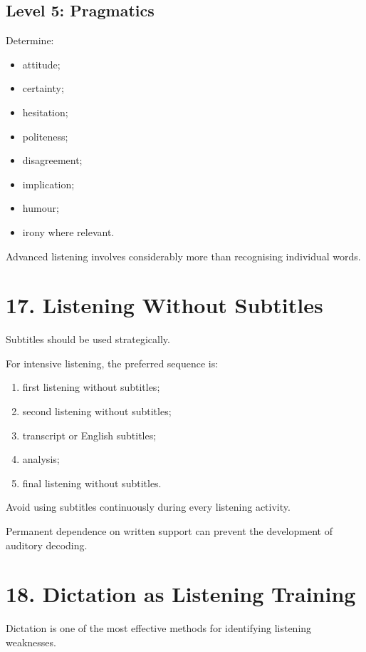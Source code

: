 \subsection*{Level 5: Pragmatics}

Determine:

\begin{itemize}
    \item attitude;
    \item certainty;
    \item hesitation;
    \item politeness;
    \item disagreement;
    \item implication;
    \item humour;
    \item irony where relevant.
\end{itemize}

Advanced listening involves considerably more than recognising individual words.

\section*{17. Listening Without Subtitles}

Subtitles should be used strategically.

For intensive listening, the preferred sequence is:

\begin{enumerate}
    \item first listening without subtitles;
    \item second listening without subtitles;
    \item transcript or English subtitles;
    \item analysis;
    \item final listening without subtitles.
\end{enumerate}

Avoid using subtitles continuously during every listening activity.

Permanent dependence on written support can prevent the development of auditory decoding.

\section*{18. Dictation as Listening Training}

Dictation is one of the most effective methods for identifying listening weaknesses.

